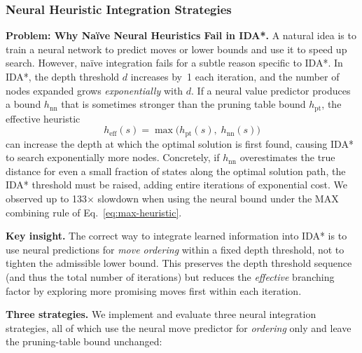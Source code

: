 \documentclass[10pt,twocolumn,a4paper]{article}
\begin{document}
\subsubsection{Neural Heuristic Integration Strategies}
\label{sec:neural-strategies}

\textbf{Problem: Why Na\"ive Neural Heuristics Fail in IDA*.}
A natural idea is to train a neural network to predict moves or lower bounds and use it to speed up search. However, na\"ive integration fails for a subtle reason specific to IDA*. In IDA*, the depth threshold $d$ increases by~1 each iteration, and the number of nodes expanded grows \emph{exponentially} with $d$. If a neural value predictor produces a bound $h_{\mathrm{nn}}$ that is sometimes stronger than the pruning table bound $h_{\mathrm{pt}}$, the effective heuristic
\begin{equation}
h_{\text{eff}}(s) = \max\bigl(h_{\mathrm{pt}}(s),\; h_{\mathrm{nn}}(s)\bigr)
\label{eq:max-heuristic}
\end{equation}
can increase the depth at which the optimal solution is first found, causing IDA* to search exponentially more nodes. Concretely, if $h_{\mathrm{nn}}$ overestimates the true distance for even a small fraction of states along the optimal solution path, the IDA* threshold must be raised, adding entire iterations of exponential cost. We observed up to 133$\times$ slowdown when using the neural bound under the MAX combining rule of Eq.~\eqref{eq:max-heuristic}.

\textbf{Key insight.} The correct way to integrate learned information into IDA* is to use neural predictions for \emph{move ordering} within a fixed depth threshold, not to tighten the admissible lower bound. This preserves the depth threshold sequence (and thus the total number of iterations) but reduces the \emph{effective} branching factor by exploring more promising moves first within each iteration.

\textbf{Three strategies.} We implement and evaluate three neural integration strategies, all of which use the neural move predictor for \emph{ordering} only and leave the pruning-table bound unchanged:
\end{document}

